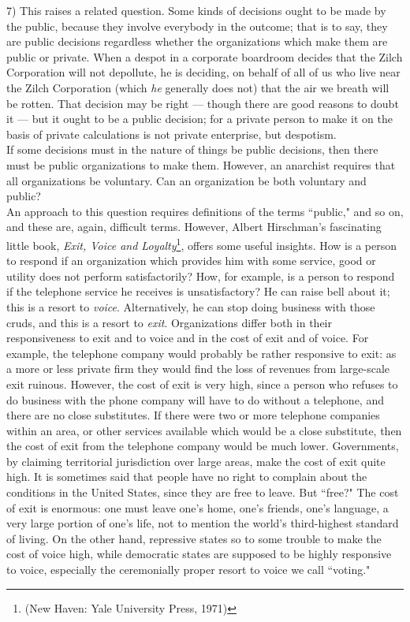 7) This raises a related question. Some kinds of decisions ought to be made by the public, because they involve everybody in the outcome; that is to say, they are public decisions regardless whether the organizations which make them are public or private. When a despot in a corporate boardroom decides that the Zilch Corporation will not depollute, he is deciding, on behalf of all of us who live near the Zilch Corporation (which \emph{he} generally does not) that the air we breath will be rotten. That decision may be right --- though there are good reasons to doubt it --- but it ought to be a public decision; for a private person to make it on the basis of private calculations is not private enterprise, but despotism.\\
If some decisions must in the nature of things be public decisions, then there must be public organizations to make them. However, an anarchist requires that all organizations be voluntary. Can an organization be both voluntary and public?\\
An approach to this question requires definitions of the terms ``public," and so on, and these are, again, difficult terms. However, Albert Hirschman's fascinating little book, \emph{Exit, Voice and Loyalty}\footnote{(New Haven: Yale University Press, 1971)}, offers some useful insights. How is a person to respond if an organization which provides him with some service, good or utility does not perform satisfactorily? How, for example, is a person to respond if the telephone service he receives is unsatisfactory? He can raise bell about it; this is a resort to \emph{voice}. Alternatively, he can stop doing business with those cruds, and this is a resort to \emph{exit}. Organizations differ both in their responsiveness to exit and to voice and in the cost of exit and of voice. For example, the telephone company would probably be rather responsive to exit: as a more or less private firm they would find the loss of revenues from large-scale exit ruinous. However, the cost of exit is very high, since a person who refuses to do business with the phone company will have to do without a telephone, and there are no close substitutes. If there were two or more telephone companies within an area, or other services available which would be a close substitute, then the cost of exit from the telephone company would be much lower. Governments, by claiming territorial jurisdiction over large areas, make the cost of exit quite high. It is sometimes said that people have no right to complain about the conditions in the United States, since they are free to leave. But ``free?" The cost of exit is enormous: one must leave one's home, one's friends, one's language, a very large portion of one's life, not to mention the world's third-highest standard of living. On the other hand, repressive states so to some trouble to make the cost of voice high, while democratic states are supposed to be highly responsive to voice, especially the ceremonially proper resort to voice we call ``voting."\\
